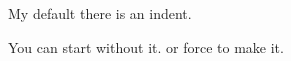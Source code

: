 \documentclass{article}
\begin{document}
\vspace*{\fill} \vspace*{-5ex}

My default there is an indent.
\par\noindent You can start without it. \indent or force to make it.

\vspace*{\fill}
\end{document}
